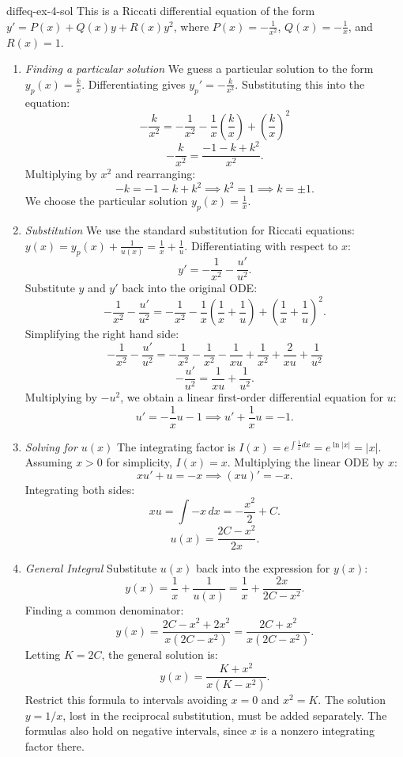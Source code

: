 \documentclass[preview]{standalone}
\begin{document}
\begin{snippetsolution}{diffeq-ex-4-sol}{}
    This is a Riccati differential equation of the form \( y' = P(x) + Q(x)y + R(x)y^2 \), where \( P(x) = -\frac{1}{x^2} \), \( Q(x) = -\frac{1}{x} \), and \( R(x) = 1 \).
    \begin{enumerate}
        \item \emph{Finding a particular solution}
        We guess a particular solution to the form \( y_p(x) = \frac{k}{x} \).
        Differentiating gives \( y_p' = -\frac{k}{x^2} \). Substituting this into the equation:
        \[ -\frac{k}{x^2} = -\frac{1}{x^2} - \frac{1}{x}\left(\frac{k}{x}\right) + \left(\frac{k}{x}\right)^2 \]
        \[ -\frac{k}{x^2} = \frac{-1 - k + k^2}{x^2}. \]
        Multiplying by \( x^2 \) and rearranging:
        \[ -k = -1 - k + k^2 \implies k^2 = 1 \implies k = \pm 1. \]
        We choose the particular solution \( y_p(x) = \frac{1}{x} \).
        \item \emph{Substitution}
        We use the standard substitution for Riccati equations: \( y(x) = y_p(x) + \frac{1}{u(x)} = \frac{1}{x} + \frac{1}{u} \).
        Differentiating with respect to \( x \):
        \[ y' = -\frac{1}{x^2} - \frac{u'}{u^2}. \]
        Substitute \( y \) and \( y' \) back into the original ODE:
        \[ -\frac{1}{x^2} - \frac{u'}{u^2} = -\frac{1}{x^2} - \frac{1}{x}\left(\frac{1}{x} + \frac{1}{u}\right) + \left(\frac{1}{x} + \frac{1}{u}\right)^2. \]
        Simplifying the right hand side:
        \[ -\frac{1}{x^2} - \frac{u'}{u^2} = -\frac{1}{x^2} - \frac{1}{x^2} - \frac{1}{xu} + \frac{1}{x^2} + \frac{2}{xu} + \frac{1}{u^2} \]
        \[ -\frac{u'}{u^2} = \frac{1}{xu} + \frac{1}{u^2}. \]
        Multiplying by \( -u^2 \), we obtain a linear first-order differential equation for \( u \):
        \[ u' = -\frac{1}{x}u - 1 \implies u' + \frac{1}{x}u = -1. \]
        \item \emph{Solving for \( u(x) \)}
        The integrating factor is \( I(x) = e^{\int \frac{1}{x} dx} = e^{\ln|x|} = |x| \). Assuming \( x > 0 \) for simplicity, \( I(x) = x \).
        Multiplying the linear ODE by \( x \):
        \[ xu' + u = -x \implies (xu)' = -x. \]
        Integrating both sides:
        \[ xu = \int -x \, dx = -\frac{x^2}{2} + C. \]
        \[ u(x) = \frac{2C - x^2}{2x}. \]
        \item \emph{General Integral}
        Substitute \( u(x) \) back into the expression for \( y(x) \):
        \[ y(x) = \frac{1}{x} + \frac{1}{u(x)} = \frac{1}{x} + \frac{2x}{2C - x^2}. \]
        Finding a common denominator:
        \[ y(x) = \frac{2C - x^2 + 2x^2}{x(2C - x^2)} = \frac{2C + x^2}{x(2C - x^2)}. \]
        Letting \( K = 2C \), the general solution is:
        \[ y(x) = \frac{K + x^2}{x(K - x^2)}. \]
        Restrict this formula to intervals avoiding \(x=0\) and \(x^2=K\).
        The solution \(y=1/x\), lost in the reciprocal substitution,
        must be added separately. The formulas also hold on negative
        intervals, since \(x\) is a nonzero integrating factor there.
    \end{enumerate}
\end{snippetsolution}
\end{document}
